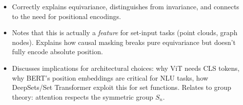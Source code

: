\begin{interviewq}

\goodgreat
\begin{itemize}
    \item {} Correctly explains equivariance, distinguishes from invariance, and connects to the need for positional encodings.
    \item {} Notes that this is actually a \textit{feature} for set-input tasks (point clouds, graph nodes). Explains how causal masking breaks pure equivariance but doesn't fully encode absolute position.
    \item {} Discusses implications for architectural choices: why ViT needs CLS tokens, why BERT's position embeddings are critical for NLU tasks, how DeepSets/Set Transformer exploit this for set functions. Relates to group theory: attention respects the symmetric group $S_n$.
\end{itemize}

\end{interviewq}

